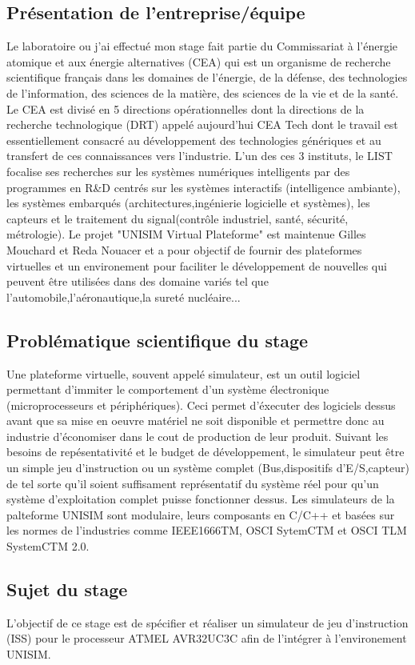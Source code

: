 \subsection{Présentation de l'entreprise/équipe}
Le laboratoire ou j'ai effectué mon stage fait partie du Commissariat à l'énergie atomique et aux énergie alternatives (CEA) qui est un organisme de recherche scientifique
français dans les domaines de l'énergie, de la défense, des technologies de l'information, des sciences de la matière, des sciences de la vie et de la santé.
Le CEA est divisé en 5 directions opérationnelles dont la directions de la recherche technologique (DRT) appelé aujourd'hui CEA Tech dont le travail est essentiellement consacré
au développement des technologies génériques et au transfert de ces connaissances vers l'industrie.
L'un des ces 3 instituts, le LIST focalise ses recherches sur les systèmes numériques intelligents par des programmes en R\&D centrés sur les systèmes interactifs (intelligence ambiante),
les systèmes embarqués (architectures,ingénierie logicielle et systèmes), les capteurs et le traitement du signal(contrôle industriel, santé, sécurité, métrologie).
Le projet "UNISIM  Virtual Plateforme" est maintenue Gilles Mouchard et Reda Nouacer et a pour objectif de fournir des plateformes virtuelles 
et un environement pour faciliter le développement de nouvelles qui peuvent être utilisées dans des domaine variés tel que l'automobile,l'aéronautique,la sureté nucléaire...

\subsection{Problématique scientifique du stage}
Une plateforme virtuelle, souvent appelé simulateur, est un outil logiciel permettant d'immiter le comportement d'un système électronique (microprocesseurs et périphériques).
Ceci permet d'éxecuter des logiciels dessus avant que sa mise en oeuvre matériel ne soit disponible et permettre donc au industrie d'économiser dans le cout de production de leur produit. 
Suivant les besoins de repésentativité et le budget de développement, le simulateur peut être un simple jeu d'instruction ou un système complet (Bus,dispositifs d'E/S,capteur)
de tel sorte qu'il soient suffisament représentatif du système réel pour qu'un système d'exploitation complet puisse fonctionner dessus. 
Les simulateurs de la palteforme UNISIM sont modulaire, leurs composants en C/C++ et basées sur les normes de l'industries comme IEEE1666TM, OSCI SytemCTM et
OSCI TLM SystemCTM 2.0.

\subsection{Sujet du stage}
L'objectif de ce stage est de spécifier et réaliser un simulateur de jeu d'instruction (ISS) pour le processeur ATMEL AVR32UC3C afin de l'intégrer à l'environement UNISIM.